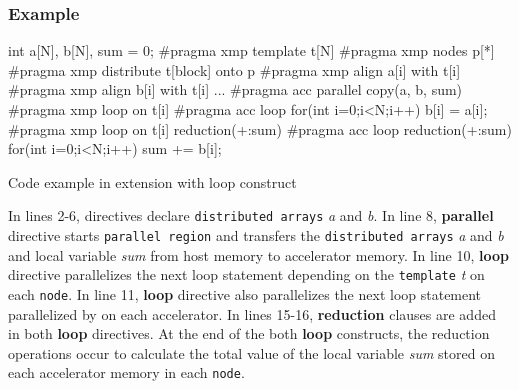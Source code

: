 \subsubsection*{Example}
\begin{myfigure}
\begin{minipage}{0.45\hsize}
\begin{center}
\end{center}
\end{minipage}
%
\begin{minipage}{0.53\hsize}
\begin{center}
\begin{XACCCexampleR}
int a[N], b[N], sum = 0;
#pragma xmp template t[N]
#pragma xmp nodes p[*]
#pragma xmp distribute t[block] onto p
#pragma xmp align a[i] with t[i]
#pragma xmp align b[i] with t[i]
...
#pragma acc parallel copy(a, b, sum)
{
#pragma xmp loop on t[i]
#pragma acc loop
  for(int i=0;i<N;i++){
    b[i] = a[i];
  }
#pragma xmp loop on t[i] reduction(+:sum)
#pragma acc loop reduction(+:sum)
  for(int i=0;i<N;i++){
    sum += b[i];
  }
}
\end{XACCCexampleR}
\end{center}
\end{minipage}
\caption{Code example in {\XMP} extension with {\OACC} loop construct}\label{code:ex-oacc-loop}
\end{myfigure}

In lines 2-6,
{\XMP} directives declare {\tt distributed arrays} {\it a} and {\it b}.
In line 8,
{\OACC} {\bf parallel} directive starts {\tt parallel region} and transfers the {\tt distributed arrays} {\it a} and {\it b} and local variable {\it sum} from host memory to accelerator memory.
In line 10,
{\XMP} {\bf loop} directive parallelizes the next loop statement depending on the {\tt template} {\it t} on each {\tt node}.
In line 11,
{\OACC} {\bf loop} directive also parallelizes the next loop statement parallelized by {\XMP} on each accelerator.
In lines 15-16, 
{\bf reduction} clauses are added in both {\bf loop} directives.
At the end of the both {\bf loop} constructs, 
the reduction operations occur to calculate 
the total value of the local variable {\it sum} stored on each accelerator memory in each {\tt node}.

